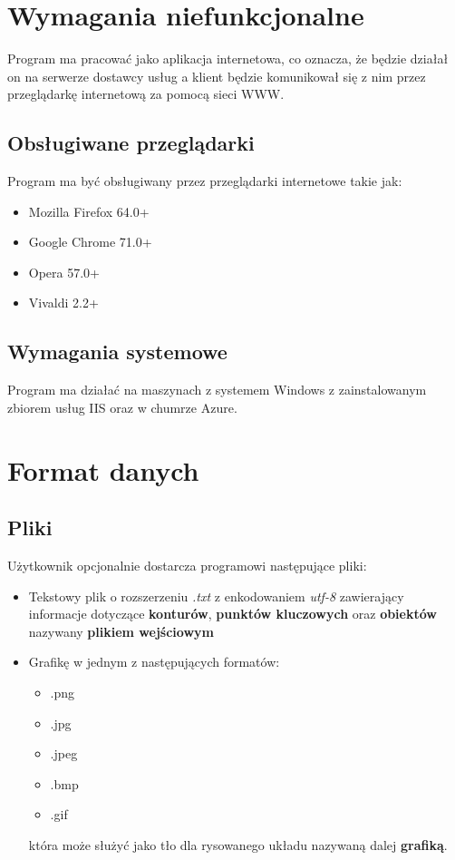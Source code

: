 \documentclass[a4paper, 10pt, titlepage]{article}
\begin{document}
\section{Wymagania niefunkcjonalne}
Program ma pracować jako aplikacja internetowa, co oznacza, że będzie działał on na serwerze dostawcy usług a klient będzie komunikował się z nim przez przeglądarkę internetową za pomocą sieci WWW.

\subsection{Obsługiwane przeglądarki}
Program ma być obsługiwany przez przeglądarki internetowe takie jak:
\begin{itemize}
\item Mozilla Firefox 64.0+
\item Google Chrome 71.0+
\item Opera 57.0+
\item Vivaldi 2.2+
\end{itemize}

\subsection{Wymagania systemowe}
Program ma działać na maszynach z systemem Windows z zainstalowanym zbiorem usług IIS oraz w chumrze Azure.

\section{Format danych}
\label{sec:daneWej}

\subsection{Pliki}
Użytkownik opcjonalnie dostarcza programowi następujące pliki:
\begin{itemize}
\item Tekstowy plik o rozszerzeniu \textit{.txt} z enkodowaniem \textit{utf-8} zawierający informacje dotyczące \textbf{konturów}, \textbf{punktów kluczowych} oraz \textbf{obiektów} nazywany \textbf{plikiem wejściowym}
\item Grafikę w jednym z następujących formatów: 
\begin{itemize}
\item .png
\item .jpg
\item .jpeg
\item .bmp
\item .gif
\end{itemize}
która może służyć jako tło dla rysowanego układu nazywaną dalej \textbf{grafiką}.
\end{itemize}
\end{document}
